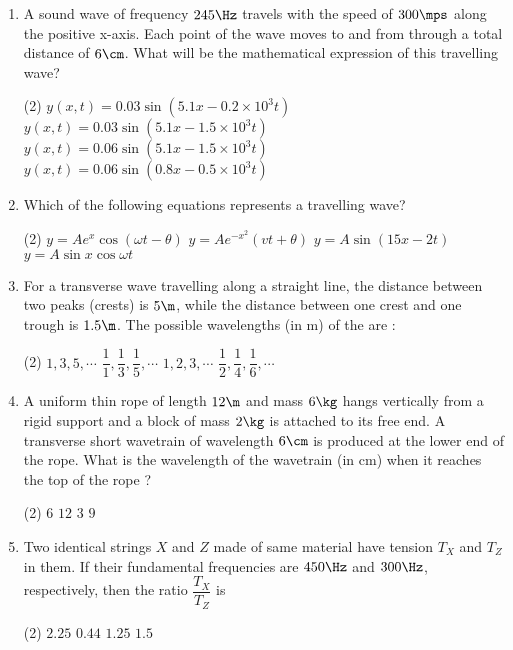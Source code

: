 \documentclass{article}
\renewcommand{\ans}{\quad}
\begin{document}
\begin{enumerate}
\item A sound wave of frequency $245\Hz$ travels with the speed of $300\mps$ along the positive x-axis. Each point of the wave moves to and from through a total distance of $6\cm$. What will be the mathematical expression of this travelling wave?
	\begin{tasks}(2)
		\task $y(x, t)=0.03\sin\left(5.1 x -0.2\times 10^3 t\right)$
		\task $y(x, t)=0.03\sin\left(5.1 x -1.5\times 10^3 t\right)$\ans
		\task $y(x, t)=0.06\sin\left(5.1 x -1.5\times 10^3 t\right)$
		\task $y(x, t)=0.06\sin\left(0.8 x -0.5\times 10^3 t\right)$
	\end{tasks}

\item Which of the following equations represents a travelling wave?
	\begin{tasks}(2)
		\task $y=Ae^x\cos(\omega t -\theta)$
		\task $y=Ae^{-x^2}(vt+\theta)$
		\task $y=A\sin(15x - 2t)$\ans
		\task $y=A\sin x \cos \omega t$
	\end{tasks}

\item For a transverse wave travelling along a straight line, the distance between two peaks (crests) is $5 \m$, while the distance between one crest and one trough is $1.5 \m$. The possible wavelengths (in m) of the are : 
	\begin{tasks}(2)
		\task $1, 3,  5, \cdots$
		\task $\dfrac{1}{1}, \dfrac{1}{3}, \dfrac{1}{5}, \cdots$ \ans
		\task $1, 2, 3, \cdots$
		\task $\dfrac{1}{2}, \dfrac{1}{4}, \dfrac{1}{6}, \cdots$
	\end{tasks}

\item A uniform thin rope of length $12 \m$ and mass $6 \kg$ hangs vertically from a rigid support and a block of mass $2 \kg$ is attached to its free end. A transverse short wavetrain of wavelength $6 \cm$ is produced at the lower end of the rope. What is the wavelength of the wavetrain (in cm) when it reaches the top of the rope ?
	\begin{tasks}(2)
		\task $6$
		\task $12$\ans
		\task $3$
		\task $9$
	\end{tasks}

\item Two identical strings $X$ and $Z$ made of same material have tension $T_X$ and $T_Z$ in them. If their fundamental frequencies are $450 \Hz$ and $300 \Hz$, respectively, then the ratio $\dfrac{T_X}{T_Z}$ is 
	\begin{tasks}(2)
		\task $2.25$\ans
		\task $0.44$
		\task $1.25$
		\task $1.5$
	\end{tasks}


\end{enumerate}
\end{document}
